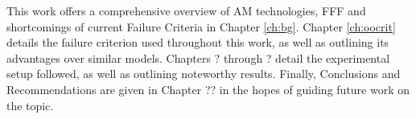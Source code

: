 \documentclass[main.tex]{subfiles}
\begin{document}
This work offers a comprehensive overview of AM technologies, FFF and shortcomings of current Failure Criteria in Chapter \ref{ch:bg}. Chapter \ref{ch:oocrit} details the failure criterion used throughout this work, as well as outlining its advantages over similar models. Chapters ? through ? detail the experimental setup followed, as well as outlining noteworthy results. Finally, Conclusions and Recommendations are given in Chapter ?? in the hopes of guiding future work on the topic. %

% 
%
%
%
\end{document}
